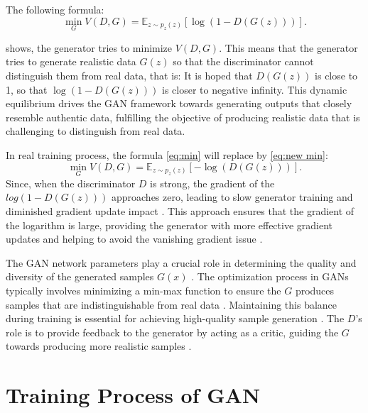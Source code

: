 The following formula:
\begin{equation}
    \label{eq:min}
    \min_{G} V(D, G) = \mathbb{E}_{z \sim p_{z}(z)} [\log(1 - D(G(z)))].
\end{equation}

shows, the generator tries to minimize $V(D, G)$. 
This means that the generator tries to generate realistic data $G(z)$ so that the discriminator cannot distinguish 
them from real data, that is: It is hoped that $D(G(z))$ is close to 1, so that $\log (1 - D(G(z)))$ is closer to negative infinity.
This dynamic equilibrium drives the GAN framework towards generating outputs that closely resemble authentic data, 
fulfilling the objective of producing realistic data that is challenging to distinguish from real data.




In real training process, the formula \eqref{eq:min} will replace by \eqref{eq:new min}:
\begin{equation}
    \label{eq:new min}
    \min_{G} V(D, G) = \mathbb{E}_{z \sim p_{z}(z)} [-\log(D(G(z)))].
\end{equation}
Since, when the discriminator $ D$ is strong, 
the gradient of the $log(1 - D(G(z)))$ approaches zero, leading to slow generator training and diminished gradient update impact \citep{10.1007/s11263-019-01265-2}.  
This approach ensures that the gradient of the logarithm is large, providing the generator with more effective gradient updates and 
helping to avoid the vanishing gradient issue \citep{10.1109/tpami.2018.2872043}.



The GAN network parameters play a crucial role in determining the quality and diversity of 
the generated samples $G(x)$ \citep{10.1007/s10928-021-09787-4}. The optimization process in GANs 
typically involves minimizing a min-max function to ensure the $G$ produces samples that 
are indistinguishable from real data \citep{10.1109/taslp.2017.2761547}. Maintaining this balance 
during training is essential for achieving high-quality sample generation \citep{10.1007/s10928-021-09787-4}. 
The $D$'s role is to provide feedback to the generator by acting as a critic, 
guiding the $G$ towards producing more realistic samples \citep{10.48550/arxiv.1802.05637}.



\section{Training Process of GAN}

